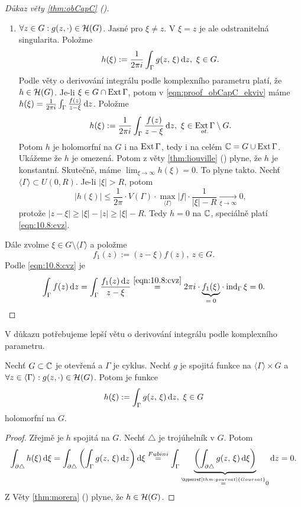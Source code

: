 \begin{proof}[Důkaz věty \cref{thm:obCapC} ()]
\begin{enumerate}[label=(\alph*)]
        \item $\forall z\in G:g(z,\cdot)\in \operatorname{\mathcal{H}}(G)$. Jasné pro $\xi\neq z$. V $\xi=z$ je ale odstranitelná singularita. Položme 
        $$h(\xi):=\frac{1}{2\pi i}\int_\Gamma g(z,\, \xi)\mathop{}\!\mathrm{d} z,\ \xi \in G.$$
        Podle věty o derivování integrálu podle komplexního parametru platí, že $h \in\operatorname{\mathcal{H}}(G)$. Je-li $\xi\in G\cap\operatorname{Ext}\Gamma$, potom v \cref{eqn:proof_obCapC_ekviv} máme $h(\xi)=\frac{1}{2\pi i}\int_\Gamma\frac{f(z)}{z-\xi}\mathop{}\!\mathrm{d} z$. Položme 
        $$h(\xi):=\frac{1}{2\pi i}\int_\Gamma\frac{f(z)}{z-\xi}\mathop{}\!\mathrm{d} z,\ \xi \in \underset{ot.}{\operatorname{Ext}\Gamma}\setminus G.$$
        Potom $h$ je holomorfní na $G$ i na $\operatorname{Ext}\Gamma$, tedy i na celém $\operatorname{\mathbb{C}}=G\cup\operatorname{Ext}\Gamma$. Ukážeme že $h$ je omezená. Potom z věty \cref{thm:liouville} () plyne, že $h$ je konstantní. Skutečně, máme $\lim_{\xi\rightarrow\infty}h(\xi)=0$. To plyne takto.
        Nechť $\langle\Gamma\rangle\subset U(0,R).$ Je-li $|\xi|>R$, potom
        $$|h(\xi)|\leq\frac{1}{2\pi}\cdot V(\Gamma)\cdot\underset{\langle\Gamma\rangle}{\max}|f|\cdot\frac{1}{|\xi|-R}\xrightarrow[\xi\rightarrow\infty]{}0,$$
        protože $|z-\xi|\geq|\xi|-|z|\geq|\xi|-R$. Tedy $h=0$ na $\operatorname{\mathbb{C}}$, speciálně platí \cref{eqn:10.8:cvz}.
    \end{enumerate}
    
    Dále zvolme $\xi\in G\setminus\langle\Gamma\rangle$ a položme 
    $$f_1(z):=(z-\xi)f(z),\ z\in G.$$ 
    Podle \cref{eqn:10.8:cvz} je 
    $$\int_\Gamma f(z)\diff z=\int_\Gamma\frac{f_1(z) \diff z}{z-\xi}
    \stackrel{\cref{eqn:10.8:cvz}}{=}2\pi i \cdot \underset{=\; 0}{\underbrace{f_1(\xi)}}\cdot\ind_\Gamma\xi=0.$$
\end{proof}
V důkazu potřebujeme lepší větu o derivování integrálu podle komplexního parametru.

\begin{theorem}
Nechť $G\subset\operatorname{\mathbb{C}}$ je otevřená a $\Gamma$ je cyklus. Nechť $g$ je spojitá funkce na $\langle\Gamma\rangle\times G$ a $\forall z\in \langle\Gamma\rangle:g(z,\cdot)\in \operatorname{\mathcal{H}}(G)$. Potom je funkce $$h(\xi):=\int_\Gamma g(z,\, \xi)\diff z,\ \xi \in G$$ holomorfní na $G$.
\end{theorem}

\begin{proof}
Zřejmě je $h$ spojitá na $G$. Nechť $\triangle$ je trojúhelník v $G$. Potom $$\int_{\partial\triangle}h(\xi)\diff \xi=\int_{\partial\triangle}\left(\int_\Gamma g(z,\, \xi)\diff z\right)\diff \xi \stackrel{Fubini}{=}\int_\Gamma\underbrace{\left(\int_{\partial\triangle} g(z,\, \xi)\diff \xi \right)}_{\stackrel{\hyperref[thm:goursat]{Goursat}}{=}0}\diff z = 0.$$ 
Z Věty \cref{thm:morera} () plyne, že $h\in\operatorname{\mathcal{H}}(G)$.
\end{proof}

